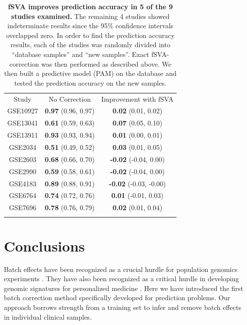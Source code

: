 \documentclass{bioinfo}\usepackage{graphicx, color}
\begin{document}
\begin{table}
\begin{center}
\begin{tabular}{ccc}
   & \\
  \hline
Study & No Correction &  Improvement with fSVA \\
  \hline
GSE10927 & \textbf{0.97}
				  (0.96, 0.97) 
		 & \textbf{0.02}
				  (0.01, 0.02)  \\
GSE13041 & \textbf{0.61}
				  (0.59, 0.63) 
		 & \textbf{0.07}
				  (0.05, 0.10)  \\
GSE13911 & \textbf{0.93}
				  (0.93, 0.94) 
		 & \textbf{0.01}
				  (0.00, 0.01)  \\
GSE2034  & \textbf{0.51}
				  (0.49, 0.52) 
		 & \textbf{0.03}
				  (0.01, 0.05)  \\
GSE2603  & \textbf{0.68}
				  (0.66, 0.70) 
		 & \textbf{-0.02}
				  (-0.04, 0.00)  \\
GSE2990  & \textbf{0.59}
				  (0.58, 0.61) 
		 & \textbf{-0.02}
				  (-0.04, 0.00)  \\
GSE4183  & \textbf{0.89}
				  (0.88, 0.91) 
		 & \textbf{-0.02}
				  (-0.03, -0.00)  \\
GSE6764  & \textbf{0.74}
				  (0.72, 0.76) 
		 & \textbf{0.01}
				  (-0.01, 0.03)  \\
GSE7696  & \textbf{0.78}
				  (0.76, 0.79) 
		 & \textbf{0.02}
				  (0.01, 0.04)  \\
\hline
 & \\
\end{tabular}
\caption{\textbf{fSVA improves prediction accuracy in 5 of the 9 studies examined.} The remaining 4 studies showed indeterminate results since the 95\% confidence intervals overlapped zero.  In order to find the prediction accuracy results, each of the studies was randomly divided into ``database samples'' and ``new samples''.  Exact fSVA-correction was then performed as described above.  We then built a predictive model (PAM) on the database and tested the prediction accuracy on the new samples.}
\end{center}
\label{studytab}
\end{table}


\section{Conclusions}

Batch effects have been recognized as a crucial hurdle for population genomics experiments \citep{Leek2010,Parker2012}. They have also been recognized as a critical hurdle in developing genomic signatures for personalized medicine \citep{Micheel2012}. Here we have introduced the first batch correction method specifically developed for prediction problems. Our approach borrows strength from a training set to infer and remove batch effects in individual clinical samples. 
\end{document}
